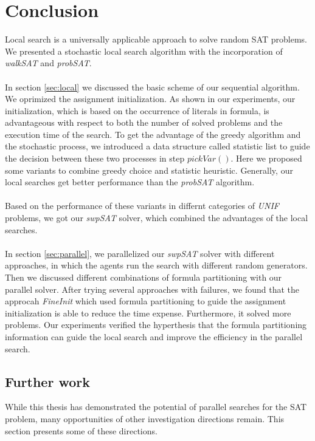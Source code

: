 \documentclass[12pt,a4paper,twoside]{scrartcl}
\numberwithin{equation}{section}
\begin{document}
\section{Conclusion}

\label{sec:conc}
Local search is a universally applicable approach to solve random SAT problems. We presented a stochastic local search algorithm with the incorporation of \emph{walkSAT} and \emph{probSAT}.\\
\\
In section \ref{sec:local} we discussed the basic scheme of our sequential algorithm. We oprimized the assignment initialization. As shown in our experiments, our initialization,  which is based on the occurrence of literals in formula, is advantageous with respect to both the number of solved problems and the execution time of the search. To get the advantage of the greedy algorithm and the stochastic process, we introduced a data structure called statistic list to guide the decision between these two processes in step $pickVar()$. Here we proposed some variants to combine greedy choice and statistic heuristic. Generally, our local searches get better performance than the \emph{probSAT} algorithm. \\
\\
Based on the performance of these variants in differnt categories of \emph{UNIF} problems, we got our \emph{swpSAT} solver, which combined the advantages of the local searches. \\
\\
In section \ref{sec:parallel}, we parallelized our \emph{swpSAT} solver with different approaches, in which the agents run the search with different random generators. Then we discussed different combinations of formula partitioning with our parallel solver. After trying several approaches with failures, we found that the approcah \emph{FineInit} which used formula partitioning to guide the assignment initialization is able to reduce the time expense.  Furthermore, it solved more problems. Our experiments verified the hyperthesis that the formula partitioning information can guide the local search and improve the efficiency in the parallel search.
\subsection{Further work}
While this thesis has demonstrated the potential of parallel searches for the
SAT problem, many opportunities of other investigation directions remain. This section presents some of these directions.
\end{document}
